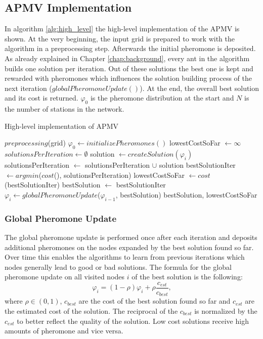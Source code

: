 \subsection{APMV Implementation}
In algorithm \ref{alg:high_level} the high-level implementation of the APMV is shown. At the very beginning, the input grid is prepared to work with the algorithm in a preprocessing step. Afterwards the initial pheromone is deposited. As already explained in Chapter \ref{chap:background}, every ant in the algorithm builds one solution per iteration. Out of these solutions the best one is kept and rewarded with pheromones which influences the solution building process of the next iteration ($globalPheromoneUpdate()$). At the end, the overall best solution and its cost is returned. $\varphi_0$ is the pheromone distribution at the start and $N$ is the number of stations in the network.

\begin{algorithm}[h]
	\caption{High-level implementation of APMV}
	\label{alg:high_level}
	\begin{algorithmic}[1]
		\State $preprocessing$(grid) 
		\State $\varphi_0 \gets initializePheromones()$ 
		\State lowestCostSoFar $\gets \infty$ 
		\State $solutionsPerIteration \gets \emptyset$
		\State solution $\gets createSolution(\varphi_i)$
		\State solutionsPerIteration $\gets$ solutionsPerIteration $\cup$ solution
		\EndFor
		\State bestSolutionIter $\gets argmin$($cost$(), solutionsPerIteration)
		\State lowestCostSoFar $\gets cost$(bestSolutionIter)
		\State bestSolution $\gets$ bestSolutionIter
		\EndIf
		\State $\varphi_i \gets globalPheromoneUpdate$($\varphi_{i-1}$, bestSolution)
		\EndFor
		\State \Return bestSolution, lowestCostSoFar
	\end{algorithmic}
\end{algorithm}

\subsubsection{Global Pheromone Update}
The global pheromone update is performed once after each iteration and deposits additional pheromones on the nodes expanded by the best solution found so far. Over time this enables the algorithms to learn from previous iterations which nodes generally lead to good or bad solutions. The formula for the global pheromone update on all visited nodes $i$ of the best solution is the following:
$$\varphi_i = (1-\rho) \varphi_i + \rho \frac{c_{est}}{c_{best}},$$
where $\rho \in (0,1)$, $c_{best}$ are the cost of the best solution found so far and $c_{est}$ are the estimated cost of the solution. The reciprocal of the $c_{best}$ is normalized by the $c_{est}$ to better reflect the quality of the solution. Low cost solutions receive high amounts of pheromone and vice versa.

